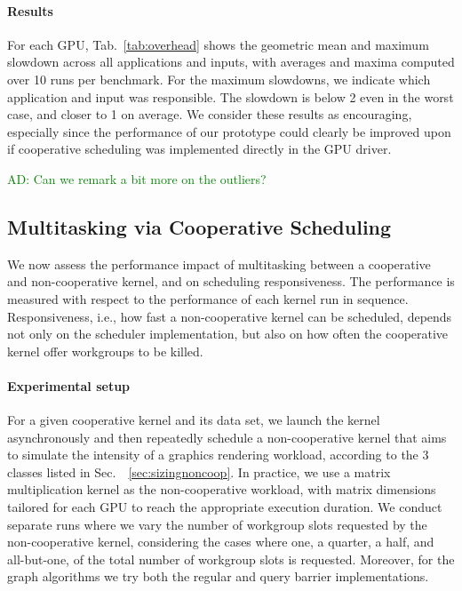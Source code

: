 \documentclass[numbers,nocopyrightspace,10pt]{sigplanconf}
\newcommand{\ADComment}[1]{\textcolor{green}{AD: #1}}
\newcommand{\mytab}{Tab.~}
\newcommand{\mysec}{Sec.~}
\begin{document}
\paragraph{Results}
For each GPU, \mytab\ref{tab:overhead} shows the geometric mean and
maximum slowdown across all applications and inputs, with averages and
maxima computed over 10 runs per benchmark. For the maximum slowdowns,
we indicate which application and input was responsible. The slowdown is
below 2 even in the worst case, and closer to 1 on average. We consider
these results as encouraging, especially since the performance of our
prototype could clearly be improved upon if cooperative scheduling was
implemented directly in the GPU driver.

\ADComment{Can we remark a bit more on the outliers?}

\subsection{Multitasking via Cooperative Scheduling}\label{sec:responsiveness}

We now assess the performance impact of multitasking between a
cooperative and non-cooperative kernel, and on scheduling
responsiveness.  The performance is measured with respect to the
performance of each kernel run in sequence. Responsiveness, i.e., how
fast a non-cooperative kernel can be scheduled, depends not only on
the scheduler implementation, but also on how often the cooperative
kernel offer workgroups to be killed.


\paragraph{Experimental setup}
For a given cooperative kernel and its data set, we launch the kernel
asynchronously and then repeatedly schedule a non-cooperative kernel
that aims to simulate the intensity of a graphics rendering workload,
according to the 3 classes listed in \mysec~\ref{sec:sizingnoncoop}. In
practice, we use a matrix multiplication kernel as the non-cooperative
workload, with matrix dimensions tailored for each GPU to reach the
appropriate execution duration.  We conduct separate runs where we vary
the number of workgroup slots requested by the non-cooperative kernel,
considering the cases where one, a quarter, a half, and all-but-one, of
the total number of workgroup slots is requested.  Moreover, for the
graph algorithms we try both the regular and query barrier
implementations.
\end{document}
